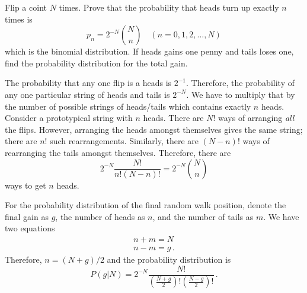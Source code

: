 

Flip a coint $N$ times.
Prove that the probability that heads turn up exactly $n$ times is
\begin{equation*}
  p_n = 2^{-N} \binom{N}{n} \quad (n=0,1,2,\ldots,N)
\end{equation*}
which is the binomial distribution.
If heads gains one penny and tails loses one, find the probability distribution for the total gain.


The probability that any one flip is a heads is $2^{-1}$.
Therefore, the probability of any one particular string of heads and tails is $2^{-N}$.
We have to multiply that by the number of possible strings of heads/tails which contains exactly $n$ heads.
Consider a prototypical string with $n$ heads.
There are $N!$ ways of arranging \emph{all} the flips.
However, arranging the heads amongst themselves gives the same string; there are $n!$ such rearrangements.
Similarly, there are $(N-n)!$ ways of rearranging the tails amongst themselves.
Therefore, there are
\begin{equation*}
  2^{-N} \frac{N!}{n! (N-n)!} = 2^{-N} \binom{N}{n}
\end{equation*}
ways to get $n$ heads.

For the probability distribution of the final random walk position, denote the final gain as $g$, the number of heads as $n$, and the number of tails as $m$.
We have two equations
\begin{align*}
  n + m = N \\
  n - m = g
  \, .
\end{align*}
Therefore, $n = (N + g) / 2$ and the probability distribution is
\begin{equation*}
  P(g | N) = 2^{-N} \frac{N!}{\left( \frac{N+g}{2} \right)! \left( \frac{N-g}{2}\right)!}
  \, .
\end{equation*}
